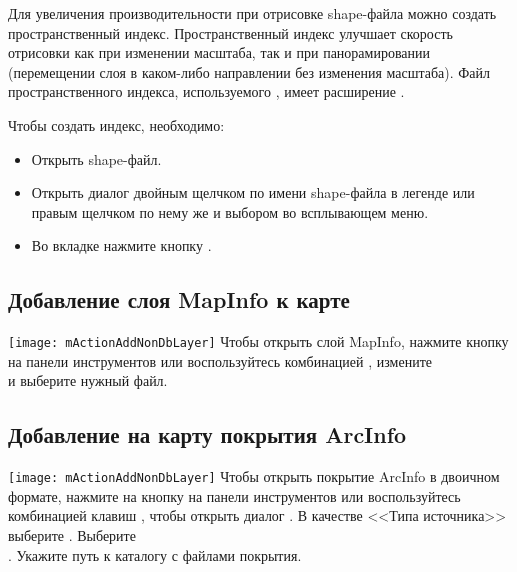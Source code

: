 Для увеличения производительности при отрисовке shape-файла можно создать
пространственный индекс. Пространственный индекс 
улучшает скорость отрисовки как при изменении масштаба, так и при
панорамировании (перемещении слоя в каком-либо направлении без изменения
масштаба). Файл пространственного индекса, используемого \qg, имеет
расширение .

Чтобы создать индекс, необходимо:

\begin{itemize}[label=--]
\item Открыть shape-файл.
\item Открыть диалог  двойным щелчком по имени
shape-файла в легенде или правым щелчком по нему же и выбором
 во всплывающем меню.
\item Во вкладке  нажмите кнопку .
\end{itemize}

\subsection{Добавление слоя MapInfo к карте}

\texttt{[image: mActionAddNonDbLayer]} Чтобы открыть слой
MapInfo, нажмите кнопку  на панели инструментов или воспользуйтесь комбинацией
, измените \\
и выберите нужный файл.

\subsection{Добавление на карту покрытия ArcInfo}

\texttt{[image: mActionAddNonDbLayer]} Чтобы открыть покрытие ArcInfo
в двоичном формате, нажмите на кнопку
 на панели
инструментов или воспользуйтесь комбинацией клавиш ,
чтобы открыть диалог . В качестве
<<Типа источника>> выберите . Выберите \\
. Укажите путь к каталогу
с файлами покрытия.


